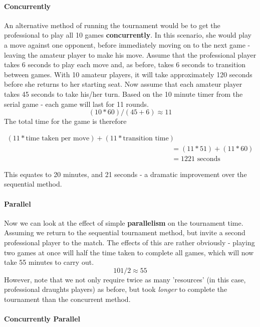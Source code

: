 \paragraph{Concurrently}

An alternative method of running the tournament would be to get the professional
to play all 10 games \textbf{concurrently}. In this scenario, she would play
a move against one opponent, before immediately moving on to the next game -
leaving the amateur player to make his move. Assume that the professional player
takes 6 seconds to play each move and, as before, takes 6 seconds to transition
between games. With 10 amateur players, it will take approximately 120 seconds
before she returns to her starting seat. Now assume that each amateur player
takes 45 seconds to take his/her turn. Based on the 10 minute timer from the
serial game - each game will last for 11 rounds.
$$(10 * 60) / (45 + 6) \approx 11$$
The total time for the game is therefore

\begin{equation}
  \begin{split}
    (11 * \text{time taken per move}) + (11 * \text{transition time}) \\
    &= (11 * 51) + (11 * 60) \\
    &= 1221 \text{ seconds}
  \end{split}
\end{equation}

This equates to 20 minutes, and 21 seconds - a dramatic improvement over the
sequential method. \\

\paragraph{Parallel}

Now we can look at the effect of simple \textbf{parallelism} on the tournament
time. Assuming we return to the sequential tournament method, but invite a
second professional player to the match. The effects of this are rather
obviously - playing two games at once will half the time taken to complete all
games, which will now take 55 minutes to carry out. $$101/2 \approx 55$$
However, note that we not only require twice as many 'resources' (in this case,
professional draughts players) as before, but took \emph{longer} to complete the
tournament than the concurrent method. \\

\paragraph{Concurrently Parallel}

